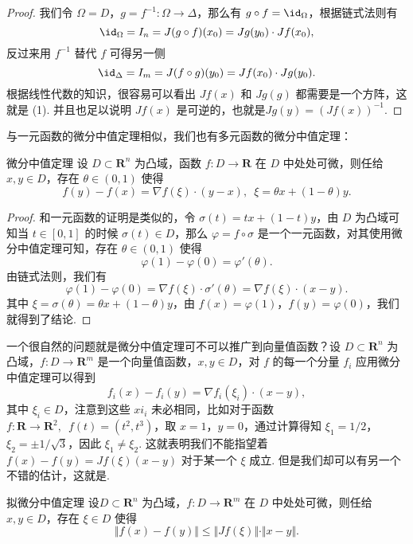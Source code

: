 \begin{proof}
    我们令 $\Omega = D$，$g = f^{-1}\colon \Omega\to\Delta$，那么有 $g \circ f = \id_{\Omega}$，根据链式法则有 \[\id_{\Omega} = I_{n} = J(g\circ f)(x_0) = Jg(y_0)\cdot Jf(x_0),\]
    反过来用 $f^{-1}$ 替代 $f$ 可得另一侧\[\id_{\Delta} = I_m = J(f\circ g)(y_0) = Jf(x_0)\cdot Jg(y_0).\]
    根据线性代数的知识，很容易可以看出 $Jf(x)$ 和 $Jg(g)$ 都需要是一个方阵，这就是 (1). 并且也足以说明 $Jf(x)$ 是可逆的，也就是$Jg(y) = (Jf(x))^{-1}.$
\end{proof}

与一元函数的微分中值定理相似，我们也有多元函数的微分中值定理：

\begin{theorem}{微分中值定理}{}
    设 $D\subset \mathbf{R}^n$ 为凸域，函数 $f\colon D\to \mathbf{R}$ 在 $D$ 中处处可微，则任给 $x,y\in D$，存在 $\theta\in (0, 1)$ 使得\[f(y) - f(x) = \nabla f(\xi)\cdot(y-x),\enspace \xi=\theta x + (1-\theta)y.\]
\end{theorem}

\begin{proof}
    和一元函数的证明是类似的，令 $\sigma(t) = tx + (1 - t)y$，由 $D$ 为凸域可知当 $t\in [0, 1]$ 的时候 $\sigma(t)\in D$，那么 $\varphi = f\circ \sigma$ 是一个一元函数，对其使用微分中值定理可知，存在 $\theta\in (0, 1)$ 使得 \[\varphi(1) - \varphi(0) = \varphi'(\theta).\]
    由链式法则，我们有 \[\varphi(1) - \varphi(0) = \nabla f(\xi)\cdot\sigma'(\theta) = \nabla f(\xi)\cdot(x - y).\]
    其中 $\xi = \sigma(\theta) = \theta x + (1 - \theta)y$，由 $f(x) = \varphi(1)$，$f(y) = \varphi(0)$，我们就得到了结论.
\end{proof}

一个很自然的问题就是微分中值定理可不可以推广到向量值函数？设 $D\subset \mathbf{R}^n$ 为凸域，$f\colon D\to \mathbf{R}^m$ 是一个向量值函数，$x, y\in D$，对 $f$ 的每一个分量 $f_i$ 应用微分中值定理可以得到\[f_i(x) - f_i(y) = \nabla f_i(\xi_i)\cdot(x-y),\]其中 $\xi_i\in D$，注意到这些 $xi_i$ 未必相同，比如对于函数 $f\colon \mathbf{R}\to\mathbf{R}^2,\enspace f(t) = (t^2, t^3)$，取 $x = 1$，$y = 0$，通过计算得知 $\xi_1 = 1/2$，$\xi_2 = \pm1/\sqrt{3}$，因此 $\xi_1 \neq \xi_2$. 这就表明我们不能指望着 $f(x) - f(y) = Jf(\xi)(x-y)$ 对于某一个 $\xi$ 成立. 但是我们却可以有另一个不错的估计，这就是.

\begin{theorem}{拟微分中值定理}{}
    设$D\subset \mathbf{R}^n$ 为凸域，$f\colon D\to \mathbf{R}^m$ 在 $D$ 中处处可微，则任给 $x, y\in D$，存在 $\xi\in D$ 使得\[\Vert f(x) - f(y)\Vert \leqslant \Vert Jf(\xi)\Vert\cdot \Vert x - y\Vert.\]
\end{theorem}

